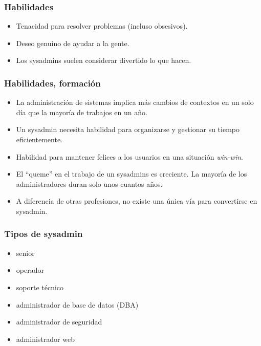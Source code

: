 \documentclass{beamer}
\begin{document}

\begin{frame}
\frametitle{Habilidades}

\begin{itemize}
\item Tenacidad para resolver problemas (incluso obsesivos).
\item Deseo genuino de ayudar a la gente.
\item Los sysadmins suelen considerar divertido lo que hacen.
\end{itemize}
\end{frame}


\begin{frame}
\frametitle{Habilidades, formación}

\begin{itemize}
\item La administración de sistemas implica más cambios de contextos en un solo día que la mayoría de trabajos en un año.
\item Un sysadmin necesita habilidad para organizarse y gestionar su tiempo eficientemente.
\item Habilidad para mantener felices a los usuarios en una situación \textit{win-win}.
\item El ``queme'' en el trabajo de un sysadmins es creciente. La mayoría de los administradores duran solo unos cuantos años.
\item A diferencia de otras profesiones, no existe una única vía para convertirse en sysadmin.
\end{itemize}
\end{frame}


\begin{frame}
\frametitle{Tipos de sysadmin}

\begin{itemize}
\item senior
\item operador
\item soporte técnico 
\item administrador de base de datos (DBA)
\item administrador de seguridad
\item administrador web
\end{itemize}
\end{frame}
\end{document}
